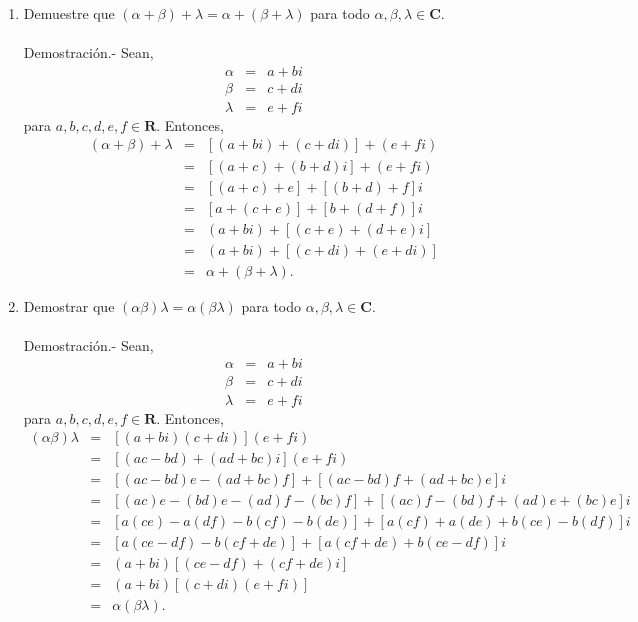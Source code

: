 \begin{enumerate}[\bfseries 1.]
    \item Demuestre que $(\alpha+\beta)+\lambda=\alpha+(\beta+\lambda)$ para todo $\alpha,\beta,\lambda\in \textbf{C}$.\\\\
	Demostración.-\; Sean,
	$$\begin{array}{rcl}
	    \alpha & = & a+bi\\
	    \beta & = & c+di\\
	    \lambda & = & e+fi
	\end{array}$$
	para $a,b,c,d,e,f \in \textbf{R}.$ Entonces,
	$$\begin{array}{rcl}
	    (\alpha + \beta )+\lambda & = & \left[(a+bi)+(c+di)\right]+(e+fi)\\
				      & = & \left[(a+c)+(b+d)i\right] + (e+fi)\\
				      & = & \left[(a+c)+e\right]+\left[(b+d)+f\right]i\\
				      & = & \left[a+(c+e)\right]+\left[b+(d+f)\right]i\\
				      & = & (a+bi) + \left[(c+e)+(d+e)i\right]\\
				      & = & (a+bi) + \left[(c+di)+(e+di)\right]\\
				      & = & \alpha + (\beta + \lambda).
	\end{array}$$
	\vspace{0.5cm}

    \item Demostrar que $(\alpha\beta)\lambda = \alpha(\beta\lambda)$ para todo $\alpha,\beta,\lambda\in \textbf{C}$.\\\\
	Demostración.-\; Sean,
	$$\begin{array}{rcl}
	    \alpha & = & a+bi\\
	    \beta & = & c+di\\
	    \lambda & = & e+fi
	\end{array}$$
	para $a,b,c,d,e,f \in \textbf{R}.$ Entonces,
	$$\begin{array}{rcl}
	    (\alpha\beta)\lambda &=& \left[(a+bi)(c+di)\right](e+fi)\\
				 &=&\left[(ac-bd)+(ad+bc)i\right](e+fi)\\
				 &=&\left[(ac-bd)e-(ad+bc)f\right]+\left[(ac-bd)f+(ad+bc)e\right]i\\
				 &=&\left[(ac)e-(bd)e-(ad)f-(bc)f\right]+\left[(ac)f-(bd)f+(ad)e+(bc)e\right]i\\
				 &=&\left[a(ce)-a(df)-b(cf)-b(de)\right]+\left[a(cf)+a(de)+b(ce)-b(df)\right]i\\
				 &=&\left[a(ce-df)-b(cf+de)\right]+\left[a(cf+de)+b(ce-df)\right]i\\
				 &=&(a+bi)\left[(ce-df)+(cf+de)i\right]\\
				 &=&(a+bi)\left[(c+di)(e+fi)\right]\\
				 &=&\alpha(\beta\lambda).
	\end{array}$$
	\vspace{0.5cm}


\end{enumerate}
